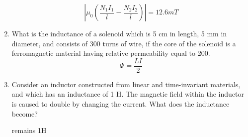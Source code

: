 \documentclass{article}
\begin{document}
\begin{enumerate}
    \begin{equation}
        \left|\mu_0(\frac{N_1I_1}{l}-\frac{N_2I_2}{l})\right| = \boxed{12.6mT}
    \end{equation}
    \item What is the inductance of a solenoid which is 5 cm in length, 5 mm in diameter, and consists of 300 turns of wire, if the core of the solenoid is a ferromagnetic material having relative permeability equal to 200.
    \begin{equation}
        \Phi = \frac{LI}{2}
    \end{equation}
    \item Consider an inductor constructed from linear and time-invariant materials, and which has an inductance of 1 H. The magnetic field within the inductor is caused to double by changing the current. What does the inductance become?
    \begin{center}
        remains 1H
    \end{center}
\end{enumerate}
\end{document}
